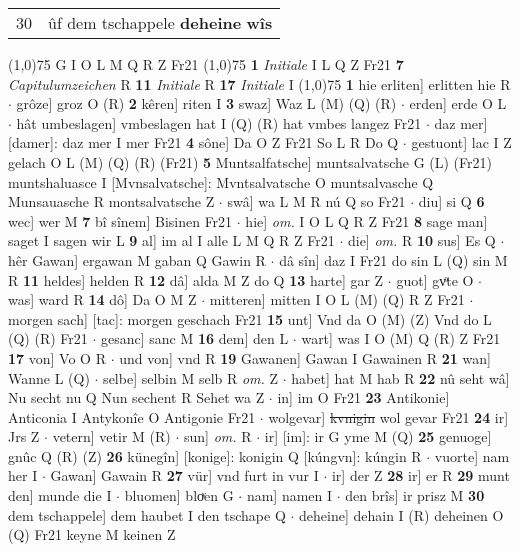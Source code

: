 \documentclass[8pt,a4paper,notitlepage]{article}
\begin{document}
\begin{table}[ht]
\begin{minipage}[t]{0.5\linewidth}
\begin{tabular}{rl}
30 & ûf dem tschappele \textbf{deheine} \textbf{wîs}\\ 
\end{tabular}
\scriptsize
\line(1,0){75} \newline
G I O L M Q R Z Fr21 \newline
\line(1,0){75} \newline
\textbf{1} \textit{Initiale} I L Q Z Fr21  \textbf{7} \textit{Capitulumzeichen} R  \textbf{11} \textit{Initiale} R  \textbf{17} \textit{Initiale} I  \newline
\line(1,0){75} \newline
\textbf{1} hie erliten] erlitten hie R  $\cdot$ grôze] groz O (R) \textbf{2} kêren] riten I \textbf{3} swaz] Waz L (M) (Q) (R)  $\cdot$ erden] erde O L  $\cdot$ hât umbeslagen] vmbeslagen hat I (Q) (R) hat vmbes langez Fr21  $\cdot$ daz mer] [damer]: daz mer I mer Fr21 \textbf{4} sône] Da O Z Fr21 So L R Do Q  $\cdot$ gestuont] lac I Z gelach O L (M) (Q) (R) (Fr21) \textbf{5} Muntsalfatsche] muntsalvatsche G (L) (Fr21) muntshaluasce I [Mvnsalvatsche]: Mvntsalvatsche O muntsalvasche Q Munsauasche R montsalvatsche Z  $\cdot$ swâ] wa L M R nú Q so Fr21  $\cdot$ diu] si Q \textbf{6} wec] wer M \textbf{7} bî sînem] Bisinen Fr21  $\cdot$ hie] \textit{om.} I O L Q R Z Fr21 \textbf{8} sage man] saget I sagen wir L \textbf{9} al] im al I alle L M Q R Z Fr21  $\cdot$ die] \textit{om.} R \textbf{10} sus] Es Q  $\cdot$ hêr Gawan] ergawan M gaban Q Gawin R  $\cdot$ dâ sîn] daz I Fr21 do sin L (Q) sin M R \textbf{11} heldes] helden R \textbf{12} dâ] alda M Z do Q \textbf{13} harte] gar Z  $\cdot$ guot] gvͦte O  $\cdot$ was] ward R \textbf{14} dô] Da O M Z  $\cdot$ mitteren] mitten I O L (M) (Q) R Z Fr21  $\cdot$ morgen sach] [tac]: morgen geschach Fr21 \textbf{15} unt] Vnd da O (M) (Z) Vnd do L (Q) (R) Fr21  $\cdot$ gesanc] sanc M \textbf{16} dem] den L  $\cdot$ wart] was I O (M) Q (R) Z Fr21 \textbf{17} von] Vo O R  $\cdot$ und von] vnd R \textbf{19} Gawanen] Gawan I Gawainen R \textbf{21} wan] Wanne L (Q)  $\cdot$ selbe] selbin M selb R \textit{om.} Z  $\cdot$ habet] hat M hab R \textbf{22} nû seht wâ] Nu secht nu Q Nun sechent R Sehet wa Z  $\cdot$ in] im O Fr21 \textbf{23} Antikonie] Anticonia I Antykonîe O Antigonie Fr21  $\cdot$ wolgevar] \sout{kvnigin} wol gevar Fr21 \textbf{24} ir] Jrs Z  $\cdot$ vetern] vetir M (R)  $\cdot$ sun] \textit{om.} R  $\cdot$ ir] [im]: ir G yme M (Q) \textbf{25} genuoge] gnûc Q (R) (Z) \textbf{26} künegîn] [konige]: konigin Q [kúngvn]: kúngin R  $\cdot$ vuorte] nam her I  $\cdot$ Gawan] Gawain R \textbf{27} vür] vnd furt in vur I  $\cdot$ ir] der Z \textbf{28} ir] er R \textbf{29} munt den] munde die I  $\cdot$ bluomen] bloͮen G  $\cdot$ nam] namen I  $\cdot$ den brîs] ir prisz M \textbf{30} dem tschappele] dem haubet I den tschape Q  $\cdot$ deheine] dehain I (R) deheinen O (Q) Fr21 keyne M keinen Z \newline

\end{minipage}
\end{table}
\end{document}
